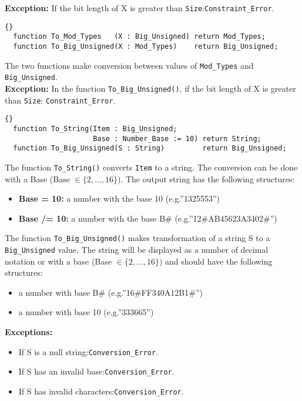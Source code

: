 \noindent\textbf{Exception:} If the bit length of X is greater than
\texttt{Size}:\quad \texttt{Constraint\_Error}.

\hhline
\begin{lstlisting}{}
  function To_Mod_Types   (X : Big_Unsigned) return Mod_Types;
  function To_Big_Unsigned(X : Mod_Types)    return Big_Unsigned;
\end{lstlisting}
The two functions make conversion between values of
\texttt{Mod\_Types} and \texttt{Big\_Unsigned}.\\

\noindent\textbf{Exception:}
In the function \texttt{To\_Big\_Unsigned()}, if
the bit length of X is greater than \texttt{Size}:\quad
\texttt{Constraint\_Error}.

\hhline
\begin{lstlisting}{}
  function To_String(Item : Big_Unsigned;
                     Base : Number_Base := 10) return String;
  function To_Big_Unsigned(S : String)         return Big_Unsigned;
\end{lstlisting}
The function \texttt{To\_String()} converts \texttt{Item} to a
string. The conversion can be done with a Base (Base $\in \{2,\ldots
,16\}$). The output string has the following structures:
\begin{itemize}
\item \textbf{Base  = 10: } a number with the base 10 (e.g.''1325553'')
\item \textbf{Base /= 10: } a number with the base B\# (e.g.''12\#AB45623A3402\#'')
\end{itemize}
The function \texttt{To\_Big\_Unsigned()} makes transformation of a
string S to a \texttt{Big\_Unsigned} value. The string will be
displayed as a number of decimal notation or with a base (Base $\in
\{2,\ldots ,16\})$ and should have the following structures:
\begin{itemize}
\item a number with base B\# (e.g.''16\#FF340A12B1\#'')
\item a number with base 10 (e.g.''333665'')
\end{itemize}

\noindent\textbf{Exceptions:}
\begin{itemize}
\item If S is a null string:\quad \texttt{Conversion\_Error}.
\item If S has an invalid base:\quad \texttt{Conversion\_Error}.
\item If S has invalid characters:\quad \texttt{Conversion\_Error}.
\end{itemize}

